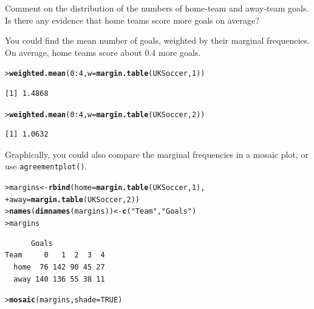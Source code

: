 \documentclass[10pt]{report}\usepackage[]{graphicx}\usepackage[]{color}
\makeatletter
\newcommand{\hlnum}[1]{\textcolor[rgb]{0.686,0.059,0.569}{#1}}%
\newcommand{\hlstr}[1]{\textcolor[rgb]{0.192,0.494,0.8}{#1}}%
\newcommand{\hlopt}[1]{\textcolor[rgb]{0,0,0}{#1}}%
\newcommand{\hlstd}[1]{\textcolor[rgb]{0.345,0.345,0.345}{#1}}%
\newcommand{\hlkwb}[1]{\textcolor[rgb]{0.69,0.353,0.396}{#1}}%
\newcommand{\hlkwc}[1]{\textcolor[rgb]{0.333,0.667,0.333}{#1}}%
\newcommand{\hlkwd}[1]{\textcolor[rgb]{0.737,0.353,0.396}{\textbf{#1}}}%
\newenvironment{kframe}{%
 \def\at@end@of@kframe{}%
 \ifinner\ifhmode%
  \def\at@end@of@kframe{\end{minipage}}%
  \begin{minipage}{\columnwidth}%
 \fi\fi%
 \def\FrameCommand##1{\hskip\@totalleftmargin \hskip-\fboxsep
 \colorbox{shadecolor}{##1}\hskip-\fboxsep
     \hskip-\linewidth \hskip-\@totalleftmargin \hskip\columnwidth}%
 \MakeFramed {\advance\hsize-\width
   \@totalleftmargin\z@ \linewidth\hsize
   \@setminipage}}%
 {\par\unskip\endMakeFramed%
 \at@end@of@kframe}
\newenvironment{knitrout}{}{} %
\renewenvironment{knitrout}{\small\renewcommand{\baselinestretch}{.85}}{} %
\makeatother
\begin{document}
\begin{Exercises}
\begin{enumerate*}
    \item Comment on the distribution of the numbers of home-team and away-team
    goals.  Is there any evidence that home teams score more goals on average?
    \begin{ans}
      You could find the mean number of goals, weighted by their marginal frequencies.
      On average, home teams score about 0.4 more goals.
\begin{knitrout}\footnotesize
{}\color{fgcolor}\begin{kframe}
\begin{alltt}
\hlstd{> }\hlkwd{weighted.mean}\hlstd{(}\hlnum{0}\hlopt{:}\hlnum{4}\hlstd{,} \hlkwc{w}\hlstd{=}\hlkwd{margin.table}\hlstd{(UKSoccer,}\hlnum{1}\hlstd{))}
\end{alltt}
\begin{verbatim}
[1] 1.4868
\end{verbatim}
\begin{alltt}
\hlstd{> }\hlkwd{weighted.mean}\hlstd{(}\hlnum{0}\hlopt{:}\hlnum{4}\hlstd{,} \hlkwc{w}\hlstd{=}\hlkwd{margin.table}\hlstd{(UKSoccer,}\hlnum{2}\hlstd{))}
\end{alltt}
\begin{verbatim}
[1] 1.0632
\end{verbatim}
\end{kframe}
\end{knitrout}
      Graphically, you could also compare the marginal frequencies in a mosaic plot, or use \texttt{agreementplot()}.
\begin{knitrout}\footnotesize
{}\color{fgcolor}\begin{kframe}
\begin{alltt}
\hlstd{> }\hlstd{margins} \hlkwb{<-} \hlkwd{rbind}\hlstd{(}\hlkwc{home}\hlstd{=}\hlkwd{margin.table}\hlstd{(UKSoccer,}\hlnum{1}\hlstd{),}
\hlstd{+ }                 \hlkwc{away}\hlstd{=}\hlkwd{margin.table}\hlstd{(UKSoccer,}\hlnum{2}\hlstd{))}
\hlstd{> }\hlkwd{names}\hlstd{(}\hlkwd{dimnames}\hlstd{(margins))} \hlkwb{<-} \hlkwd{c}\hlstd{(}\hlstr{"Team"}\hlstd{,} \hlstr{"Goals"}\hlstd{)}
\hlstd{> }\hlstd{margins}
\end{alltt}
\begin{verbatim}
      Goals
Team     0   1  2  3  4
  home  76 142 90 45 27
  away 140 136 55 38 11
\end{verbatim}
\begin{alltt}
\hlstd{> }\hlkwd{mosaic}\hlstd{(margins,} \hlkwc{shade}\hlstd{=}\hlnum{TRUE}\hlstd{)}
\end{alltt}
\end{kframe}


\end{knitrout}
\end{ans}
\end{enumerate*}
\end{Exercises}
\end{document}
